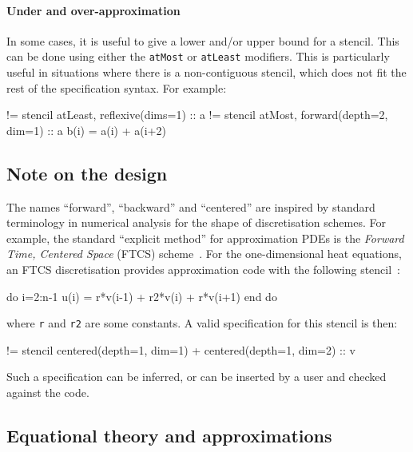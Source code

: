 \documentclass[9pt]{sigplanconf}
\theoremstyle{definition}
\newcommand{\term}[1]{\texttt{#1}}
\begin{document}
\paragraph{Under and over-approximation}

In some cases, it is useful to give a lower and/or upper bound for a
stencil. This can be done using either the \term{atMost} or
\term{atLeast} modifiers. This is particularly useful in situations
where there is a non-contiguous stencil, which does not fit the rest
of the specification syntax.  For example:
\begin{ExmVerbatim}
!= stencil atLeast, reflexive(dims=1)      :: a
!= stencil atMost, forward(depth=2, dim=1) :: a
b(i) = a(i) + a(i+2)
\end{ExmVerbatim}


\subsection{Note on the design}

The names ``forward'', ``backward'' and ``centered''
are inspired by standard terminology in numerical analysis
for the shape of discretisation schemes. For example,
the standard ``explicit method'' for approximation
PDEs is the \emph{Forward Time, Centered Space} (FTCS)
scheme~\cite{dawson1991finite}. For
the one-dimensional heat equations, an FTCS discretisation
provides approximation code with the following stencil~\cite{recktenwald2004finite}:
\begin{ExmVerbatim}
do i=2:n-1
  u(i) = r*v(i-1) + r2*v(i) + r*v(i+1)
end do
\end{ExmVerbatim}
where \texttt{r} and \texttt{r2} are some constants.
A valid specification for this stencil is then:
\begin{ExmVerbatim}
!= stencil centered(depth=1, dim=1)
         + centered(depth=1, dim=2) :: v
\end{ExmVerbatim}
Such a specification can be inferred, or can be inserted by a user
and checked against the code.

\subsection{Equational theory and approximations}
\label{sec:eqs}
\end{document}
